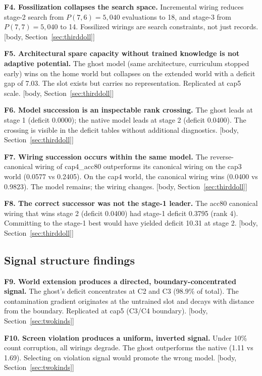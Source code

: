 \documentclass[12pt, a4paper]{article}
\begin{document}
\medskip
\noindent\textbf{F4. Fossilization collapses the search space.}
Incremental wiring reduces stage-2 search from $P(7,6) = 5{,}040$ evaluations
to 18, and stage-3 from $P(7,7) = 5{,}040$ to 14. Fossilized wirings are
search constraints, not just records. [body, Section~\ref{sec:thirddoll}]

\medskip
\noindent\textbf{F5. Architectural spare capacity without trained knowledge is
not adaptive potential.}
The ghost model (same architecture, curriculum stopped early) wins on the home
world but collapses on the extended world with a deficit gap of 7.03. The slot
exists but carries no representation. Replicated at cap5 scale.
[body, Section~\ref{sec:thirddoll}]

\medskip
\noindent\textbf{F6. Model succession is an inspectable rank crossing.}
The ghost leads at stage 1 (deficit 0.0000); the native model leads at stage 2
(deficit 0.0400). The crossing is visible in the deficit tables without
additional diagnostics. [body, Section~\ref{sec:thirddoll}]

\medskip
\noindent\textbf{F7. Wiring succession occurs within the same model.}
The reverse-canonical wiring of cap4\_acc80 outperforms its canonical wiring
on the cap3 world (0.0577 vs 0.2405). On the cap4 world, the canonical wiring
wins (0.0400 vs 0.9823). The model remains; the wiring changes.
[body, Section~\ref{sec:thirddoll}]

\medskip
\noindent\textbf{F8. The correct successor was not the stage-1 leader.}
The acc80 canonical wiring that wins stage 2 (deficit 0.0400) had stage-1
deficit 0.3795 (rank 4). Committing to the stage-1 best would have yielded
deficit 10.31 at stage 2. [body, Section~\ref{sec:thirddoll}]

\subsection*{Signal structure findings}

\noindent\textbf{F9. World extension produces a directed,
boundary-concentrated signal.}
The ghost's deficit concentrates at C2 and C3 (98.9\% of total). The
contamination gradient originates at the untrained slot and decays with
distance from the boundary. Replicated at cap5 (C3/C4 boundary).
[body, Section~\ref{sec:twokinds}]

\medskip
\noindent\textbf{F10. Screen violation produces a uniform, inverted signal.}
Under 10\% count corruption, all wirings degrade. The ghost outperforms the
native (1.11 vs 1.69). Selecting on violation signal would promote the wrong
model. [body, Section~\ref{sec:twokinds}]
\end{document}
